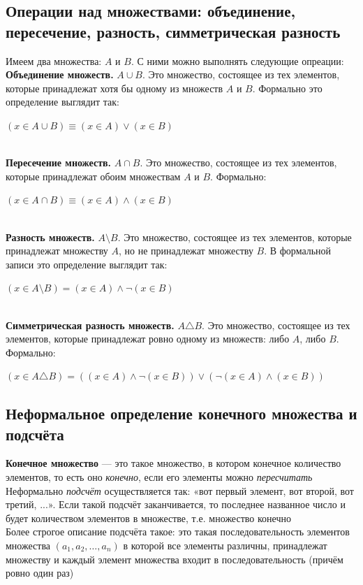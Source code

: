 \documentclass[a4paper]{article}
\begin{document}
\subsection{Операции над множествами: объединение, пересечение, разность, симметрическая разность}
Имеем два множества: $A$ и $B$. С ними можно выполнять следующие опреации:\\[2mm]
\indent \textbf{Объединение множеств.} $A\cup B$. Это множество, состоящее из тех элементов, которые принадлежат хотя бы одному из множеств $A$ и $B$. Формально это определение выглядит так:\\[2mm] \centerline{$(x\in A\cup B)\equiv(x\in A)\vee(x\in B)$}\\[2mm]
\indent \textbf{Пересечение множеств.} $A\cap B$. Это множество, состоящее из тех элементов, которые принадлежат обоим множествам $A$ и $B$. Формально:\\[2mm]
\centerline{$(x\in A\cap B)\equiv(x\in A)\wedge(x\in B)$}\\[2mm]
\indent \textbf{Разность множеств.} $A\setminus B$. Это множество, состоящее из тех элементов, которые принадлежат множеству $A$, но не принадлежат множеству $B$. В формальной записи это определение выглядит так:\\[2mm]
\centerline{$(x\in A\setminus B)=(x\in A)\wedge \neg(x\in B)$}\\[2mm]
\indent \textbf{Симметрическая разность множеств.} $A\triangle B$. Это множество, состоящее из тех элементов, которые принадлежат ровно одному из множеств: либо $A$, либо $B$. Формально:\\[2mm]
\centerline{$(x\in A\triangle B)=((x\in A)\wedge\neg(x\in B))\vee(\neg(x\in A)\wedge(x\in B))$}
\subsection{Неформальное определение конечного множества и подсчёта}
\indent\textbf{Конечное множество} — это такое множество, в котором конечное количество элементов, то есть оно \textit{конечно}, если его элементы можно \textit{пересчитать}\\[2mm]
\indent Неформально \textit{подсчёт} осуществляется так: «вот первый элемент, вот второй, вот третий, ...». Если такой подсчёт заканчивается, то последнее названное число и будет количеством элементов в множестве, т.е. множество конечно\\[2mm]
\indent Более строгое описание подсчёта такое: это такая последовательность элементов множества $(a_1, a_2, \ldots, a_n)$ в которой все элементы различны, принадлежат множеству и каждый элемент множества входит в последовательность (причём ровно один раз)
\end{document}
